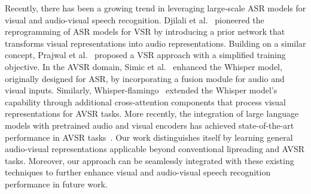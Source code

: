 


Recently, there has been a growing trend in leveraging large-scale ASR models for visual and audio-visual speech recognition. 
Djilali et al.~\cite{djilali2023lip2vec} pioneered the reprogramming of ASR models for VSR by introducing a prior network that transforms visual representations into audio representations. 
Building on a similar concept, Prajwal et al.~\cite{prajwal24_interspeech} proposed a VSR approach with a simplified training objective. 
In the AVSR domain, Simic et al.~\cite{10448047} enhanced the Whisper model, originally designed for ASR, by incorporating a fusion module for audio and visual inputs. 
Similarly, Whisper-flamingo~\cite{rouditchenko24_interspeech} extended the Whisper model's capability through additional cross-attention components that process visual representations for AVSR tasks. 
More recently, the integration of large language models with pretrained audio and visual encoders has achieved state-of-the-art performance in AVSR tasks~\cite{cappellazzo2024large}. 
Our work distinguishes itself by learning general audio-visual representations applicable beyond conventional lipreading and AVSR tasks. 
Moreover, our approach can be seamlessly integrated with these existing techniques to further enhance 
visual and audio-visual speech recognition performance in future work.


